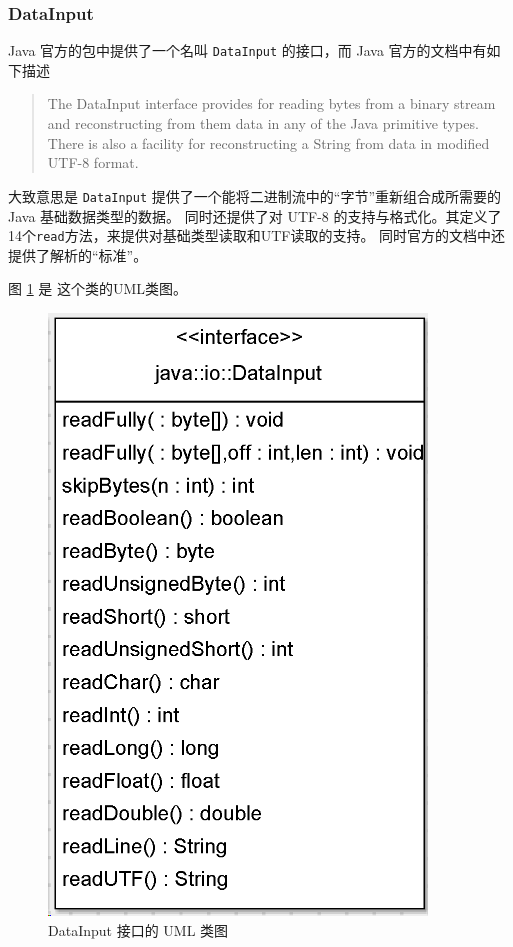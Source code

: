 
\subsubsection{DataInput}
\label{sec:uml:input:datainput}

Java 官方的包中提供了一个名叫 \lstinline|DataInput| 的接口，而 Java 官方的文档中有如下描述
\begin{quote}
    The DataInput interface provides for reading bytes from a binary stream and reconstructing from them
    data in any of the Java primitive types. There is also a facility for reconstructing a String from
    data in modified UTF-8 format. 
\end{quote}

大致意思是 \lstinline|DataInput| 提供了一个能将二进制流中的“字节”重新组合成所需要的 Java 基础数据类型的数据。
同时还提供了对 UTF-8 的支持与格式化。其定义了14个\lstinline|read|方法，来提供对基础类型读取和UTF读取的支持。
同时官方的文档中还提供了解析的“标准”。

图 \ref{fig:datainput} 是 这个类的UML类图。
\begin{figure}
\centering
\includegraphics{UML/inputstream/datainput}
\caption{DataInput 接口的 UML 类图}
\label{fig:datainput}
\end{figure}

